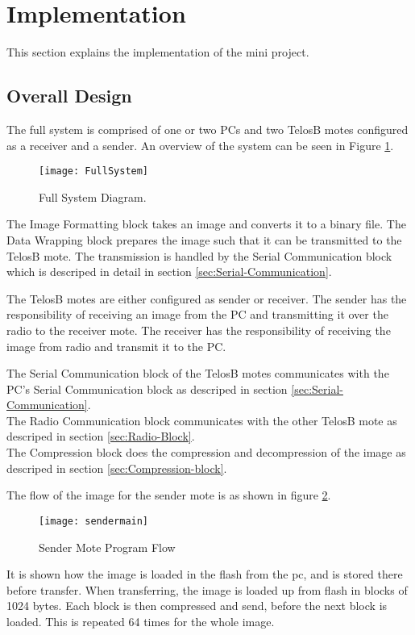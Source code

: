 \section{Implementation}
This section explains the implementation of the mini project.

\subsection{Overall Design}
The full system is comprised of one or two PCs and two TelosB motes configured as a receiver and a sender. An overview of the system can be seen in Figure \ref{FullSystem}.

\begin{figure}[H]
	\centering
	\texttt{[image: FullSystem]}
	\caption{Full System Diagram.}
	\label{FullSystem}
\end{figure}

The Image Formatting block takes an image and converts it to a binary file.
The Data Wrapping block prepares the image such that it can be transmitted to the TelosB mote.
The transmission is handled by the Serial Communication block which is descriped in detail in section \ref{sec:Serial-Communication}.

The TelosB motes are either configured as sender or receiver.  The sender has the responsibility of receiving an image from the PC and transmitting it over the radio to the receiver mote. The receiver has the responsibility of receiving the image from radio and transmit it to the PC.

The Serial Communication block of the TelosB motes communicates with the PC's Serial Communication block as descriped in section \ref{sec:Serial-Communication}.\\
The Radio Communication block communicates with the other TelosB mote as descriped in section \ref{sec:Radio-Block}. \\
The Compression block does the compression and decompression of the image as descriped in section \ref{sec:Compression-block}.

The flow of the image for the sender mote is as shown in figure \ref{fig:sendermain}.

\begin{figure}[H]
	\centering
	\texttt{[image: sendermain]}
	\caption{Sender Mote Program Flow}
	\label{fig:sendermain}
\end{figure}

It is shown how the image is loaded in the flash from the pc, and is stored there before transfer. When transferring, the image is loaded up from flash in blocks of 1024 bytes. Each block is then compressed and send, before the next block is loaded. This is repeated 64 times for the whole image.

